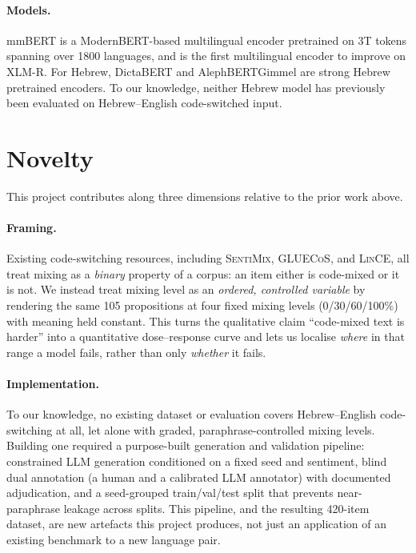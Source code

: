 \documentclass{article}
\begin{document}
\paragraph{Models.} mmBERT \citep{marone2025mmbert} is a ModernBERT-based
multilingual encoder pretrained on 3T tokens spanning over 1800 languages, and
is the first multilingual encoder to improve on XLM-R. For Hebrew, DictaBERT
\citep{shmidman2023dictabert} and AlephBERTGimmel \citep{gueta2022alephbertgimmel}
are strong Hebrew pretrained encoders. To our knowledge, neither Hebrew model
has previously been evaluated on Hebrew--English code-switched input.

\section{Novelty}
\label{sec:novelty}

This project contributes along three dimensions relative to the prior work
above.

\paragraph{Framing.} Existing code-switching resources, including
\textsc{SentiMix}, \textsc{GLUECoS}, and \textsc{LinCE}, all treat mixing as a
\emph{binary} property of a corpus: an item either is code-mixed or it is
not. We instead treat mixing level as an \emph{ordered, controlled variable}
by rendering the same 105 propositions at four fixed mixing levels
(0/30/60/100\%) with meaning held constant. This turns the qualitative claim
``code-mixed text is harder'' into a quantitative dose--response curve and
lets us localise \emph{where} in that range a model fails, rather than only
\emph{whether} it fails.

\paragraph{Implementation.} To our knowledge, no existing dataset or
evaluation covers Hebrew--English code-switching at all, let alone with
graded, paraphrase-controlled mixing levels. Building one required a
purpose-built generation and validation pipeline: constrained LLM generation
conditioned on a fixed seed and sentiment, blind dual annotation (a human and
a calibrated LLM annotator) with documented adjudication, and a seed-grouped
train/val/test split that prevents near-paraphrase leakage across splits.
This pipeline, and the resulting 420-item dataset, are new artefacts this
project produces, not just an application of an existing benchmark to a new
language pair.
\end{document}
